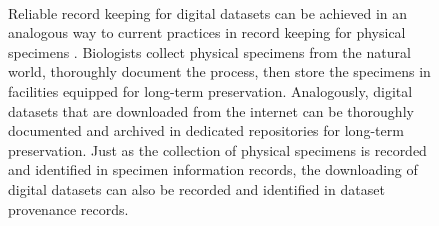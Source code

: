 \begin{figure}[ht] %


\centering
{} \\
%

\caption{Reliable record keeping for digital datasets  can be achieved in an analogous way to current practices in record keeping for physical specimens . Biologists collect physical specimens from the natural world, thoroughly document the process, then store the specimens in facilities equipped for long-term preservation. Analogously, digital datasets that are downloaded from the internet can be thoroughly documented and archived in dedicated repositories for long-term preservation. Just as the collection of physical specimens is recorded and identified in specimen information records, the downloading of digital datasets can also be recorded and identified in dataset provenance records.}%

\label{fig:collection} %

\end{figure}

